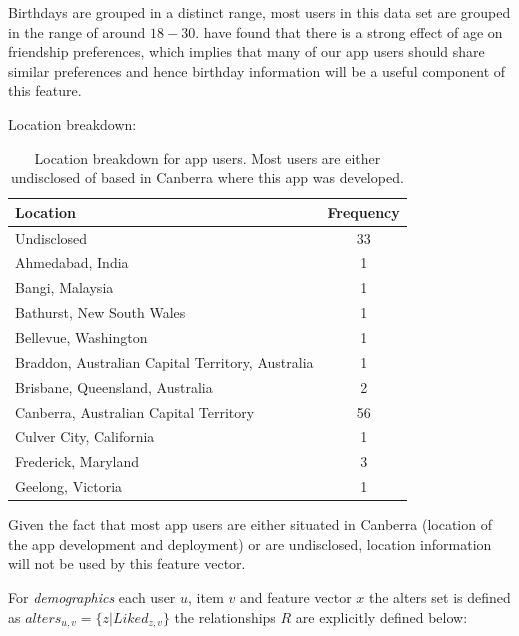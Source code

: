 Birthdays are grouped in a distinct range, most users in this data set are grouped in the range of around $18 - 30$. 
\cite{jugand} have found that there is a strong effect of age on friendship preferences, which implies that many of our app users 
should share similar preferences and hence birthday information will be a useful component of this feature.

\clearpage

Location breakdown:

\begin{table}[!htbp]
\centering
	\begin{tabular}{|l|c|} %
		\hline
		\textbf{Location} & \textbf{Frequency}  \\ \hline
		Undisclosed & 33 \\ \hline
		Ahmedabad, India & 1 \\ \hline
		Bangi, Malaysia & 1 \\ \hline
		Bathurst, New South Wales & 1 \\ \hline
		Bellevue, Washington & 1 \\ \hline
		Braddon, Australian Capital Territory, Australia & 1 \\ \hline
		Brisbane, Queensland, Australia & 2 \\ \hline
		Canberra, Australian Capital Territory & 56 \\ \hline
		Culver City, California & 1 \\ \hline
		Frederick, Maryland & 3 \\ \hline
		Geelong, Victoria & 1 \\ \hline
	\end{tabular}
	\caption{Location breakdown for app users. Most users are either undisclosed of based in Canberra where this app was developed.}
	\label{tab:revpol}
\end{table}

Given the fact that most app users are either situated in Canberra (location of the app development and deployment) or are undisclosed, 
location information will not be used by this feature vector.

For \emph{demographics} each user $u$, item $v$ and feature vector $x$ the alters set is defined as $ alters_{u,v} = \{z | Liked_{z,v}\} $
the relationships $R$ are explicitly defined below:

